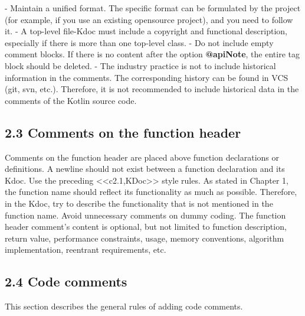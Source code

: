 - Maintain a unified format. The specific format can be formulated by the project (for example, if you use an existing opensource project), and you need to follow it.
- A top-level file-Kdoc must include a copyright and functional description, especially if there is more than one top-level class.
- Do not include empty comment blocks. If there is no content after the option \textbf{@apiNote}, the entire tag block should be deleted.
- The industry practice is not to include historical information in the comments. The corresponding history can be found in VCS (git, svn, etc.). Therefore, it is not recommended to include historical data in the comments of the Kotlin source code.
\subsection*{\textbf{2.3 Comments on the function header}}
\label{sec:2.3}
Comments on the function header are placed above function declarations or definitions. A newline should not exist between a function declaration and its Kdoc. Use the preceding <<c2.1,KDoc>> style rules.
As stated in Chapter 1, the function name should reflect its functionality as much as possible. Therefore, in the Kdoc, try to describe the functionality that is not mentioned in the function name.
Avoid unnecessary comments on dummy coding.
The function header comment's content is optional, but not limited to function description, return value, performance constraints, usage, memory conventions, algorithm implementation, reentrant requirements, etc.
\subsection*{\textbf{2.4 Code comments}}
\label{sec:2.4}
This section describes the general rules of adding code comments.

